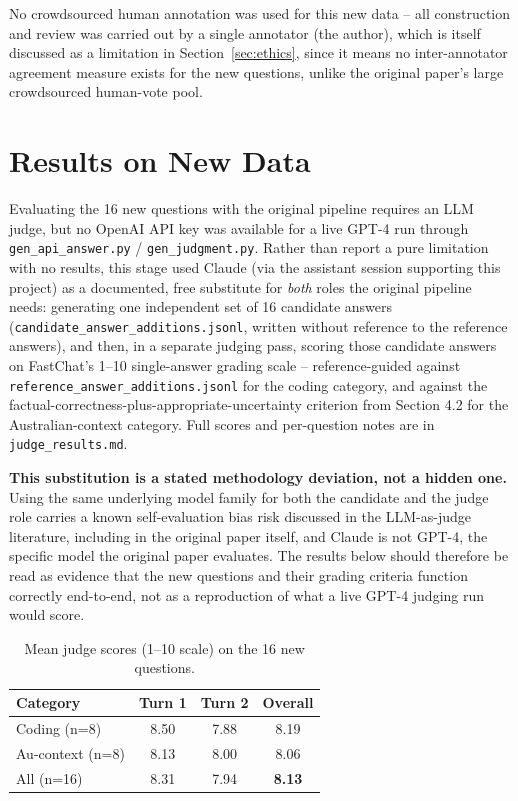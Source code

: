 \documentclass[11pt,twocolumn]{article}
\begin{document}
No crowdsourced human annotation was used for this new data -- all construction and review was
carried out by a single annotator (the author), which is itself discussed as a limitation in
Section~\ref{sec:ethics}, since it means no inter-annotator agreement measure exists for the new
questions, unlike the original paper's large crowdsourced human-vote pool.

\section{Results on New Data}
\label{sec:results}

Evaluating the 16 new questions with the original pipeline requires an LLM judge, but no OpenAI API
key was available for a live GPT-4 run through \texttt{gen\_api\_answer.py} /
\texttt{gen\_judgment.py}. Rather than report a pure limitation with no results, this stage used
Claude (via the assistant session supporting this project) as a documented, free substitute for
\emph{both} roles the original pipeline needs: generating one independent set of 16 candidate
answers (\texttt{candidate\_answer\_additions.jsonl}, written without reference to the reference
answers), and then, in a separate judging pass, scoring those candidate answers on FastChat's 1--10
single-answer grading scale -- reference-guided against \texttt{reference\_answer\_additions.jsonl}
for the coding category, and against the factual-correctness-plus-appropriate-uncertainty criterion
from Section 4.2 for the Australian-context category. Full scores and per-question notes are in
\texttt{judge\_results.md}.

\textbf{This substitution is a stated methodology deviation, not a hidden one.} Using the same
underlying model family for both the candidate and the judge role carries a known self-evaluation
bias risk discussed in the LLM-as-judge literature, including in the original paper itself,
and Claude is not GPT-4, the specific model the original paper evaluates. The results below should
therefore be read as evidence that the new questions and their grading criteria function correctly
end-to-end, not as a reproduction of what a live GPT-4 judging run would score.

\begin{table}[h]
\centering
\small
\begin{tabular}{@{}lccc@{}}
\toprule
\textbf{Category} & \textbf{Turn 1} & \textbf{Turn 2} & \textbf{Overall} \\
\midrule
Coding (n=8) & 8.50 & 7.88 & 8.19 \\
Au-context (n=8) & 8.13 & 8.00 & 8.06 \\
\midrule
All (n=16) & 8.31 & 7.94 & \textbf{8.13} \\
\bottomrule
\end{tabular}
\caption{Mean judge scores (1--10 scale) on the 16 new questions.}
\label{tab:results}
\end{table}
\end{document}
